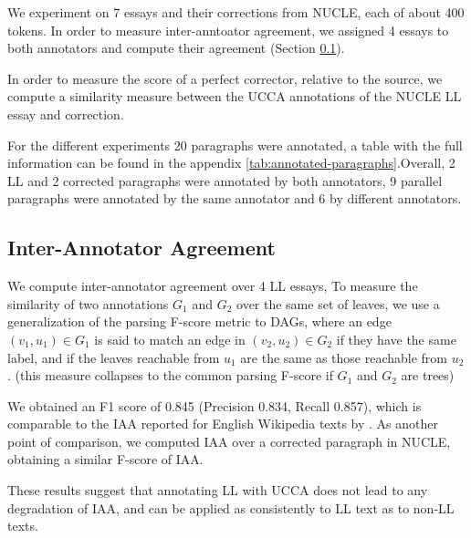 		We experiment on 7 essays and their corrections from NUCLE, each of about 400 tokens.
		In order to measure inter-anntoator agreement, we assigned 4 essays to both annotators
		and compute their agreement (Section \ref{sec:iaa}).
		
		In order to measure the score
		of a perfect corrector, relative to the source, we compute a similarity measure
		between the UCCA annotations of the NUCLE LL essay and correction.
		
		For the different experiments 20 paragraphs were annotated, a table with the full
		information can be found in the appendix \ref{tab:annotated-paragraphs}.Overall, 2 LL
		and 2 corrected paragraphs were annotated by both annotators, 9 parallel paragraphs were
		annotated by the same annotator and 6 by different annotators.
		
		\subsection{Inter-Annotator Agreement}\label{sec:iaa}
		
		We compute inter-annotator agreement over 4 LL essays, 
		To measure the similarity of two annotations $G_1$ and $G_2$ over the same set of leaves,
		we use a generalization of the parsing F-score metric to DAGs, where an
		edge $(v_1,u_1) \in G_1$ is said to match an edge in $(v_2,u_2) \in G_2$ if
		they have the same label, and if the leaves
		reachable from $u_1$ are the same as those reachable from $u_2$. 
		(this measure collapses to the common parsing F-score if $G_1$ and $G_2$ are trees)
		
		We obtained an F1 score of 0.845 (Precision 0.834, Recall 0.857), which
		is comparable to the IAA reported for English Wikipedia texts by \cite{abend2013universal}.
		As another point of comparison, we computed IAA over a corrected paragraph in NUCLE,
		obtaining a similar F-score of IAA.
		
		These results suggest that annotating LL with UCCA does not lead to any degradation
		of IAA, and can be applied as consistently to LL text as to non-LL texts.
		
		
